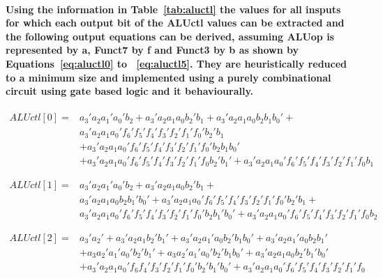 \documentclass[12pt,a4paper]{report}
\begin{document}
\paragraph{\textrm{\textmd{Using the information in Table~\ref{tab:aluctl} the values for all insputs for which each output bit of the \textbf{ALUctl} values can be extracted and the following output equations can be derived, assuming \textbf{ALUop} is represented by \textbf{a}, \textbf{Funct7} by \textbf{f} and \textbf{Funct3} by \textbf{b} as shown by Equations~\ref{eq:aluctl0} to ~\ref{eq:aluctl5}. They are heuristically reduced to a minimum size and implemented using a purely combinational circuit using gate based logic and it behaviourally.}}}

\begin{equation}
\begin{aligned}
ALUctl[0] =  & a_3'a_2a_1'a_0'b_2 + a_3'a_2a_1a_0b_2'b_1 + a_3'a_2a_1a_0b_2b_1b_0' +  \\
& a_3'a_2a_1a_0'f_6'f_5'f_4'f_3'f_2'f_1'f_0'b_2'b_1 \\ 
&+ a_3'a_2a_1a_0'f_6'f_5'f_4'f_3'f_2'f_1'f_0'b_2b_1b_0' \\
& +a_3'a_2a_1a_0'f_6'f_5'f_4'f_3'f_2'f_1'f_0b_2'b_1' + a_3'a_2a_1a_0'f_6'f_5'f_4'f_3'f_2'f_1'f_0b_1 
\end{aligned}
\label{eq:aluctl0}
\end{equation}

\begin{equation}
\begin{aligned}
ALUctl[1] = & a_3'a_2a_1'a_0'b_2 + a_3'a_2a_1a_0b_2'b_1 + \\
&  a_3'a_2a_1a_0b_2b_1'b_0' + a_3'a_2a_1a_0'f_6'f_5'f_4'f_3'f_2'f_1'f_0'b_2'b_1 + \\
& a_3'a_2a_1a_0'f_6'f_5'f_4'f_3'f_2'f_1'f_0'b_2b_1'b_0' + a_3'a_2a_1a_0'f_6'f_5'f_4'f_3'f_2'f_1'f_0b_2
\end{aligned}
\label{eq:aluctl1}
\end{equation}

\begin{equation}
\begin{aligned}
ALUctl[2] = & a_3'a_2' + a_3'a_2a_1b_2'b_1' + a_3'a_2a_1'a_0b_2'b_1b_0' 
+ a_3'a_2a_1'a_0b_2b_1' \\
&+ a_3 a_2'a_1'a_0'b_2'b_1' + a_3a_2'a_1'a_0'b_2'b_1b_0'  + a_3'a_2a_1a_0b_2'b_1'b_0'\\
& + a_3'a_2a_1a_0'f_6f_4'f_3'f_2'f_1'f_0'b_2'b_1'b_0'  + a_3'a_2a_1a_0'f_6'f_5'f_4'f_3'f_2'f_1'f_0
\end{aligned}
\label{eq:aluctl2}
\end{equation}
\end{document}

